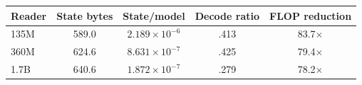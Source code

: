 \begin{tabular}{lcccc}
\toprule
Reader & State bytes & State/model & Decode ratio & FLOP reduction \\
\midrule
135M & 589.0 & $2.189\times10^{-6}$ & .413 & 83.7$\times$ \\
360M & 624.6 & $8.631\times10^{-7}$ & .425 & 79.4$\times$ \\
1.7B & 640.6 & $1.872\times10^{-7}$ & .279 & 78.2$\times$ \\
\bottomrule
\end{tabular}

